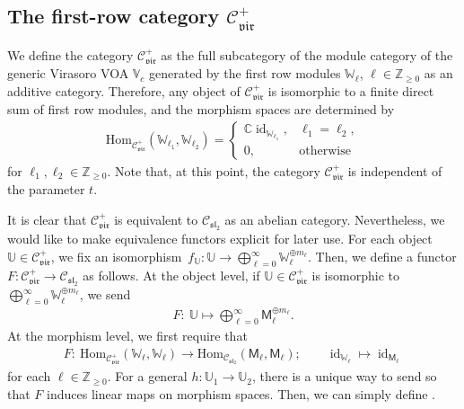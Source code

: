 \documentclass[pdftex]{sigma}
\numberwithin{equation}{section}
\newcommand{\Hom}{\mathrm{Hom}}
\newcommand{\id}{\operatorname{id}}
\newcommand{\bC}{\mathbb{C}}
\newcommand{\bZ}{\mathbb{Z}}
\newcommand{\cC}{\mathcal{C}}
\newcommand{\fsl}{\mathfrak{sl}}
\newcommand{\sfM}{\mathsf{M}}
\newcommand{\QGirrep}[1]{\sfM_{#1}}
\newcommand{\catQG}{\cC_{\fsl_{2}}}
\newcommand{\catVir}{\cC_{\vir}}
\newcommand{\virvoa}{\mathbb{V}}
\newcommand{\virmod}{\mathbb{W}}
\newcommand{\virmodgen}{\mathbb{U}}
\newcommand{\vir}{\mathfrak{vir}}
\begin{document}
\subsection[The first-row category catVir+]{The first-row category $\boldsymbol{\catVir^{+}}$}
We define the category $\catVir^{+}$ as the full subcategory of the module category of the generic Virasoro VOA $\virvoa_{c}$
generated by the first row modules $\virmod_{\ell}$, $\ell\in\bZ_{\geq 0}$ as an additive category.
Therefore, any object of $\catVir^{+}$ is isomorphic to a finite direct sum of first row modules,
and the morphism spaces are determined by
\begin{gather*}
 \Hom_{\catVir^{+}}(\virmod_{\ell_{1}},\virmod_{\ell_{2}})=
 \begin{cases}
 \bC \id_{\virmod_{\ell_{1}}},& \ell_{1}=\ell_{2},\\
 0, &\mathrm{otherwise}
 \end{cases}
\end{gather*}
for $\ell_{1},\ell_{2}\in\bZ_{\geq 0}$.
Note that, at this point, the category $\catVir^{+}$ is independent of the parameter $t$.

It is clear that $\catVir^{+}$ is equivalent to $\catQG$ as an abelian category.
Nevertheless, we would like to make equivalence functors explicit for later use.
For each object $\virmodgen\in\catVir^{+}$, we fix an isomorphism~${f_{\virmodgen}\colon \virmodgen\to\bigoplus_{\ell=0}^{\infty}\virmod_{\ell}^{\oplus m_{\ell}}}$.
Then, we define a functor $F\colon \catVir^{+}\to\catQG$ as follows.
At the object level, if $\virmodgen\in \catVir^{+}$ is isomorphic to $\bigoplus_{\ell=0}^{\infty}\virmod_{\ell}^{\oplus m_{\ell}}$, we send
\begin{gather*}
 F\colon\ \virmodgen\mapsto \bigoplus_{\ell=0}^{\infty}\QGirrep{\ell}^{\oplus m_{\ell}}.
\end{gather*}
At the morphism level, we first require that
\begin{gather*}
 F\colon\ \Hom_{\catVir^{+}}(\virmod_{\ell},\virmod_{\ell})\to \Hom_{\catQG}(\QGirrep{\ell},\QGirrep{\ell});\qquad \id_{\virmod_{\ell}}\mapsto \id_{\QGirrep{\ell}}
\end{gather*}
for each $\ell\in\bZ_{\geq 0}$.
For a general $h\colon \virmodgen_{1}\to\virmodgen_{2}$,
there is a unique way to send \smash{$f_{\virmodgen_{2}}\circ h\circ f_{\virmodgen_{1}}^{-1}$} so that $F$ induces linear maps on morphism spaces.
Then, we can simply define \smash{$F(h)=F\big(f_{\virmodgen_{2}}\circ h\circ f_{\virmodgen_{1}}^{-1}\big)$}.
\end{document}

